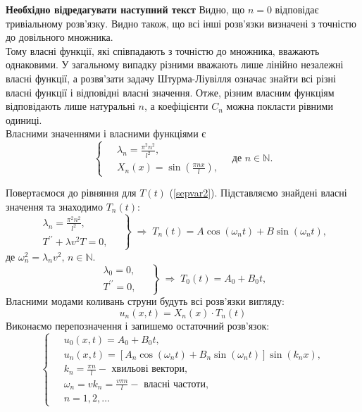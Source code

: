 \documentclass[a4paper, 14pt]{extreport}
\begin{document}
    \textbf{\Large Необхідно відредагувати наступний текст}
Видно, що $n = 0$ відповідає тривіальному розв'язку. Видно також, що всі інші розв'язки визначені з точністю до довільного множника.\\
Тому власні функції, які співпадають з точністю до множника, вважають однаковими. У загальному випадку різними вважають лише лінійно незалежні власні функції, а розвя'зати задачу Штурма-Ліувілля означає знайти всі різні власні функції і відповідні власні значення. Отже, різним власним функціям відповідають лише натуральні $n$, а коефіцієнти $C_n$ можна покласти рівними одиниці.\\
    Власними значеннями і власними функціями є
    \begin{equation} %
        \left\{ \begin{aligned}
            \;&\lambda_n = \frac{\pi^2 n^2}{l^2},\\ 
            &X_n(x) = \sin\left(\frac{\pi n x}{l}\right),
        \end{aligned} \right.
        \quad \text{де } n \in \mathbb{N}.
    \end{equation}

Повертаємося до рівняння для $T(t)$ (\ref{sepvar2}). Підставляємо знайдені власні значення та знаходимо $T_n(t)$:
\begin{equation*}
    \left. \begin{aligned}
        \lambda_n = \frac{\pi^2 n^2}{l^2},&\;\\ 
        T^{\prime\prime} + \lambda v^2T = 0,&
    \end{aligned} \right\}
    \;\Rightarrow\;
    T_n(t) = A\cos(\omega_n t) + B\sin(\omega_n t),
\end{equation*}
де $\omega_n^2 = \lambda_n v^2, \, n \in \mathbb{N}.$\\
\begin{equation*}
    \left. \begin{aligned}
        \lambda_0 = 0,&\;\\ 
        T^{\prime\prime} = 0,&
    \end{aligned} \right\}
    \;\Rightarrow\;
    T_0(t) = A_0 + B_0 t,
\end{equation*}
Власними модами коливань струни будуть всі розв'язки вигляду:
\begin{equation*}
    u_n(x,t) = X_n(x) \cdot T_n(t)
\end{equation*}
Виконаємо перепозначення і запишемо остаточний розв'язок:
\begin{equation}
    \left\{ \begin{aligned} \label{sol2}
        \;&u_0(x,t) = A_0 + B_0 t, \\
        &u_n(x,t) = \left[A_n\cos(\omega_n t) + B_n\sin(\omega_n t)\right] \sin(k_n x), \\
        &k_n = \frac{\pi n}{l} - \text{ хвильові вектори}, \\
        &\omega_n = vk_n = \frac{v \pi n}{l} - \text{ власні частоти}, \\
        &n = 1, 2,\ldots
    \end{aligned}\right.
\end{equation}
\end{document}
